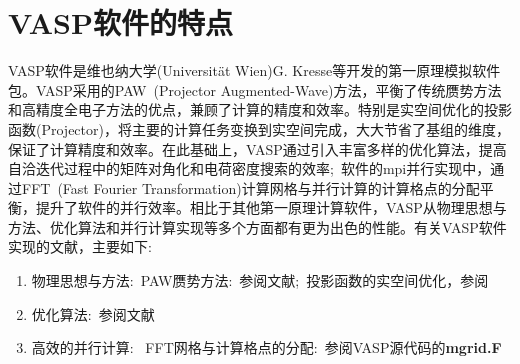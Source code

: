 \section{VASP软件的特点}
\textrm{VASP}软件是维也纳大学(Universit\"at Wien)\textrm{G. Kresse}等开发的第一原理模拟软件包。\textrm{VASP}采用的\textrm{PAW~(Projector Augmented-Wave)}方法，平衡了传统赝势方法和高精度全电子方法的优点，兼顾了计算的精度和效率。特别是实空间优化的投影函数\textrm{(Projector)}，将主要的计算任务变换到实空间完成，大大节省了基组的维度，保证了计算精度和效率。在此基础上，\textrm{VASP}通过引入丰富多样的优化算法，提高自洽迭代过程中的矩阵对角化和电荷密度搜索的效率;~软件的\textrm{mpi}并行实现中，通过\textrm{FFT~(Fast Fourier Transformation)}计算网格与并行计算的计算格点的分配平衡，提升了软件的并行效率。相比于其他第一原理计算软件，\textrm{VASP}从物理思想与方法、优化算法和并行计算实现等多个方面都有更为出色的性能。有关\textrm{VASP}软件实现的文献，主要如下:~
\begin{enumerate}
	\item 物理思想与方法:~\textrm{PAW}赝势方法:~参阅文献\cite{PRB50-17953_1994,PRB59-1758_1999};~投影函数的实空间优化，参阅\cite{JPCM6-8245_1994,PRB44-13063_1991,PRB44-8503_1991}
	\item 优化算法:~参阅文献\cite{CMS6-15_1996,PRB54-11169_1996}
	\item 高效的并行计算:~ \textrm{FFT}网格与计算格点的分配:~参阅\textrm{VASP}源代码的\textbf{mgrid.F}
\end{enumerate}
